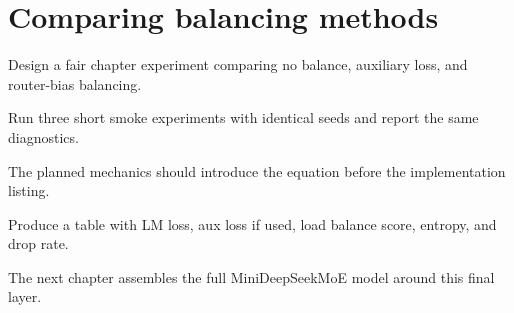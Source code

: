\section{Comparing balancing methods}
\label{sec:ch09-comparing-balancing-methods}

Design a fair chapter experiment comparing no balance, auxiliary loss, and router-bias balancing.



Run three short smoke experiments with identical seeds and report the same diagnostics.



The planned mechanics should introduce the equation before the implementation listing.





\begin{checkpointbox}
Produce a table with LM loss, aux loss if used, load balance score, entropy, and drop rate.
\end{checkpointbox}

The next chapter assembles the full MiniDeepSeekMoE model around this final layer.
